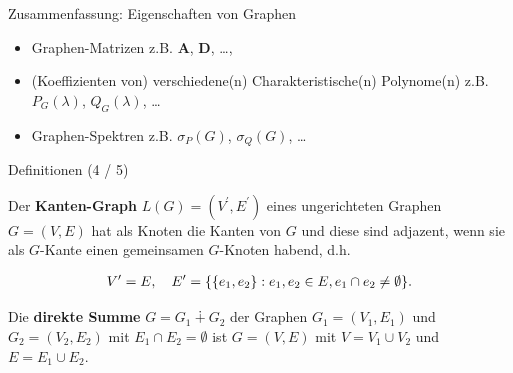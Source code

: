 \documentclass[aspectratio=169]{beamer}
\begin{document}
\begin{frame}{Zusammenfassung:  Eigenschaften von Graphen}

  \begin{block}{}

    \begin{itemize}
      \item Graphen-Matrizen z.B. $\mathbf A$, $\mathbf D$, \dots,
      \item (Koeffizienten von) verschiedene(n) Charakteristische(n) Polynome(n) z.B. $P_G(\lambda)$, $Q_G(\lambda)$, \dots
      \item Graphen-Spektren z.B. $\sigma_P(G)$, $\sigma_Q(G)$, \dots
    \end{itemize}

  \end{block}

\end{frame}

\begin{frame}{Definitionen (4 / 5)}

  \begin{definition*}

    Der \textbf{Kanten-Graph} $L(G) = (V^\prime, E^\prime)$ eines ungerichteten Graphen $G = (V, E)$ hat als Knoten die Kanten von $G$ und diese sind adjazent, wenn sie als $G$-Kante einen gemeinsamen $G$-Knoten habend, d.h.

    \begin{align*}
      V^\prime = E,
      \quad
      E^\prime = {\left \{ {\left \{ e_1, e_2 \right \}}: e_1, e_2 \in E, e_1 \cap e_2 \neq \emptyset \right \}}.
    \end{align*}

  \end{definition*}

  \begin{definition*}
    Die \textbf{direkte Summe} $G = G_1 \dotplus G_2$ der Graphen $G_1 = (V_1, E_1)$ und $G_2 = (V_2, E_2)$ mit $E_1 \cap E_2 = \emptyset$ ist $G = (V, E)$ mit $V = V_1 \cup V_2$ und $E = E_1 \cup E_2$.
  \end{definition*}

\end{frame}

\end{document}

